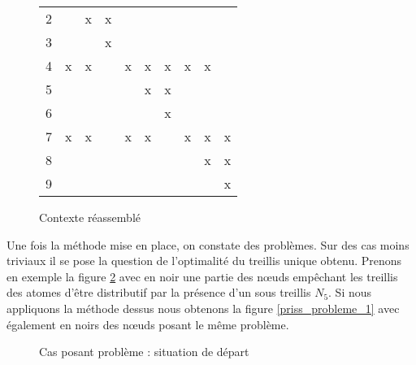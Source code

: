 \begin{figure}[H]
\begin{minipage}[c]{0.7\textwidth}
\begin{center}
\begin{tabular}{ l | c c c c c c c c c }
			2 & & x & x & & & & & & \\
			3 & & & x & & & & & & \\
			4 & x & x & & x & x & x & x & x & \\
			5 & & & & & x & x & & & \\
			6 & & & & & & x & & & \\
			7 & x & x & & x & x & & x & x & x \\
			8 & & & & & & & & x & x \\
			9 & & & & & & & & & x \\
		\end{tabular}
	\end{center}
	\caption{Contexte réassemblé}
	\label{contexte_reassemble}
	\end{minipage}
\end{figure}

Une fois la méthode mise en place, on constate des problèmes. Sur des cas moins triviaux il se pose la question de l'optimalité du treillis unique obtenu. Prenons en exemple la figure \ref{priss_probleme_base} avec en noir une partie des n\oe uds empêchant les treillis des atomes d'être distributif par la présence d'un sous treillis $N_5$. Si nous appliquons la méthode dessus nous obtenons la figure \ref{priss_probleme_1} avec également en noirs des n\oe uds posant le même problème.

\begin{figure}[H]
	\begin{center}
	\end{center}
	\caption{Cas posant problème : situation de départ}
	\label{priss_probleme_base}
\end{figure}

